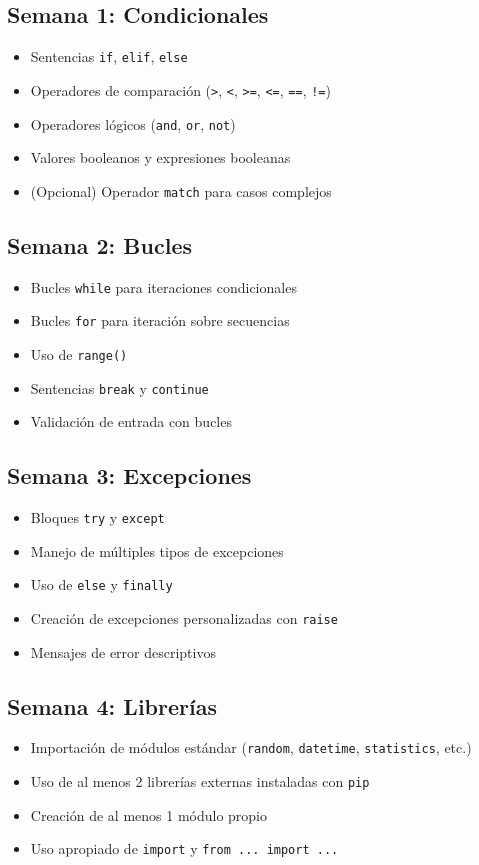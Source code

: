 \documentclass[12pt,a4paper]{article}
\begin{document}
\subsection{Semana 1: Condicionales}
\begin{itemize}
    \item Sentencias \texttt{if}, \texttt{elif}, \texttt{else}
    \item Operadores de comparación (\texttt{>}, \texttt{<}, \texttt{>=}, \texttt{<=}, \texttt{==}, \texttt{!=})
    \item Operadores lógicos (\texttt{and}, \texttt{or}, \texttt{not})
    \item Valores booleanos y expresiones booleanas
    \item (Opcional) Operador \texttt{match} para casos complejos
\end{itemize}

\subsection{Semana 2: Bucles}
\begin{itemize}
    \item Bucles \texttt{while} para iteraciones condicionales
    \item Bucles \texttt{for} para iteración sobre secuencias
    \item Uso de \texttt{range()}
    \item Sentencias \texttt{break} y \texttt{continue}
    \item Validación de entrada con bucles
\end{itemize}

\subsection{Semana 3: Excepciones}
\begin{itemize}
    \item Bloques \texttt{try} y \texttt{except}
    \item Manejo de múltiples tipos de excepciones
    \item Uso de \texttt{else} y \texttt{finally}
    \item Creación de excepciones personalizadas con \texttt{raise}
    \item Mensajes de error descriptivos
\end{itemize}

\subsection{Semana 4: Librerías}
\begin{itemize}
    \item Importación de módulos estándar (\texttt{random}, \texttt{datetime}, \texttt{statistics}, etc.)
    \item Uso de al menos 2 librerías externas instaladas con \texttt{pip}
    \item Creación de al menos 1 módulo propio
    \item Uso apropiado de \texttt{import} y \texttt{from ... import ...}
\end{itemize}
\end{document}
